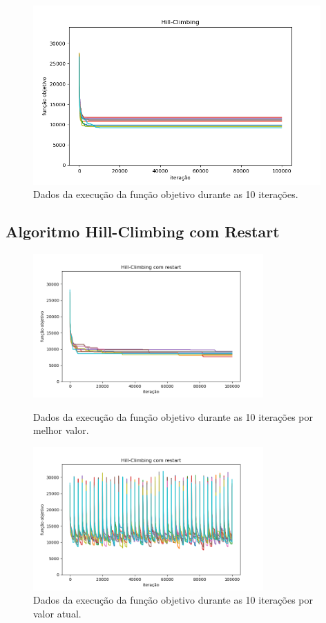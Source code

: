 \begin{figure}[H]
\centering
\includegraphics[width=110mm]{imagens/otima/problema-3-hill-climbing-funcao-objetivo-best.png}
\caption{Dados da execução da função objetivo durante as 10 iterações.
\label{fig:problema-3-hill-climbing-funcao-objetivo}}
\end{figure}

\subsection{Algoritmo Hill-Climbing com Restart}

\begin{figure}[H]
\centering
  \begin{minipage}[b]{0.48\textwidth}
    \includegraphics[width=88mm]{imagens/otima/problema-3-hill-climbing-com-restart-funcao-objetivo-best.png}
    \caption{Dados da execução da função objetivo durante as 10 iterações por melhor valor.
    \label{fig:problema-3-hill-climbing-com-restart-funcao-objetivo-best}}
  \end{minipage}
  \hfill
  \begin{minipage}[b]{0.48\textwidth}
    \includegraphics[width=88mm]{imagens/otima/problema-3-hill-climbing-com-restart-funcao-objetivo-value.png}
    \caption{Dados da execução da função objetivo durante as 10 iterações por valor atual.
    \label{fig:problema-3-hill-climbing-com-restart-funcao-objetivo-value}}
  \end{minipage}
\end{figure}

